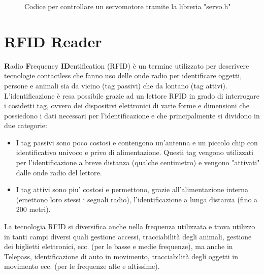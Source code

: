 \documentclass[12pt]{report}
\begin{document}
\begin{figure}
	\caption{Codice per controllare un servomotore tramite la libreria "servo.h"}
	\label{fig:servo_code}
\end{figure}

%
\section{RFID Reader}
%

\textbf{R}adio \textbf{F}requency \textbf{ID}entification (RFID) è un termine utilizzato per descrivere tecnologie contactless che fanno uso delle onde radio per identificare oggetti, persone e animali sia da vicino (tag passivi) che da lontano (tag attivi). L'identificazione è resa possibile grazie ad un lettore RFID in grado di interrogare i cosidetti tag, ovvero dei dispositivi elettronici di varie forme e dimensioni che possiedono i dati necessari per l'identificazione e che principalmente si dividono in due categorie: 

\begin{itemize}
	\item I tag passivi sono poco costosi e contengono un'antenna e un piccolo chip con identificativo univoco e privo di alimentazione. Questi tag vengono utilizzati per l'identificazione a breve distanza (qualche centimetro) e vengono "attivati" dalle onde radio del lettore.
	\item I tag attivi sono piu' costosi e permettono, grazie all'alimentazione interna (emettono loro stessi i segnali radio), l'identificazione a lunga distanza (fino a 200 metri).
\end{itemize}

La tecnologia RFID si diversifica anche nella frequenza utilizzata e trova utilizzo in tanti campi diversi quali gestione accessi, tracciabilità degli animali, gestione dei biglietti elettronici, ecc$.$ (per le basse e medie frequenze), ma anche in Telepass, identificazione di auto in movimento, tracciabilità degli oggetti in movimento ecc. (per le frequenze alte e altissime).
\end{document}
